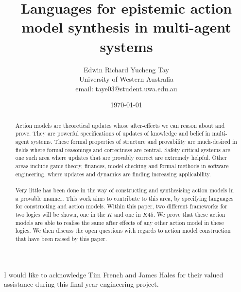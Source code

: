 \documentclass{cshonours}
\title{Languages for epistemic action model synthesis in multi-agent systems}
\author{Edwin Richard Yucheng Tay \\
University of Western Australia \\
email: taye03@student.uwa.edu.au }
\date{\today}
\numberwithin{equation}{chapter}
\newcommand{\lang}{\ensuremath{K}}
\newcommand{\langKFF}{\ensuremath{K45}}
\begin{document}
\maketitle

\begin{abstract}

Action models are theoretical updates whose after-effects we can reason about
and prove.
They are powerful specifications of updates of knowledge and belief in
multi-agent systems.
These formal properties of structure and provability are much-desired in
fields where formal reasonings and correctness are central.
Safety critical systems are one such area where updates that are provably
correct are extremely helpful.
Other areas include game theory, finances, model checking and formal methods in
software engineering, where updates and dynamics are finding increasing applicability.\\
\\
Very little has been done in the way of constructing and synthesising action
models in a provable manner.
This work aims to contribute to this area, by specifying languages for
constructing and action models.
Within this paper, two different frameworks for two logics will be shown, one in
the $\lang$ and one in $\langKFF$.
We prove that these action models are able to realise the same after effects of
any other action model in these logics.
We then discuss the open questions with regards to action model construction
that have been raised by this paper.

\end{abstract}

\begin{acknowledgements}
I would like to acknowledge Tim French and James Hales for their valued assistance during this final
year engineering project.
\end{acknowledgements}

\pagebreak

\tableofcontents

\listoffigures








\appendix







\end{document}
